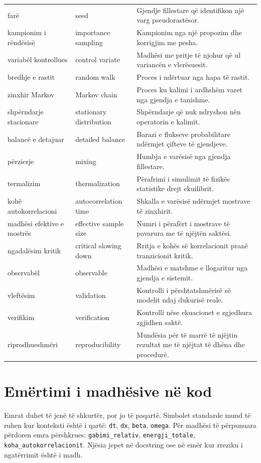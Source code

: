 \documentclass[11pt,oneside,openany]{book}
\begin{document}
\begin{longtable}{p{}p{}p{}}
farë & seed & Gjendje fillestare që identifikon një varg pseudorastësor.\\
kampionim i rëndësisë & importance sampling & Kampionim nga një propozim dhe korrigjim me pesha.\\
variabël kontrollues & control variate & Madhësi me pritje të njohur që ul variancën e vlerësuesit.\\
bredhje e rastit & random walk & Proces i ndërtuar nga hapa të rastit.\\
zinxhir Markov & Markov chain & Proces ku kalimi i ardhshëm varet nga gjendja e tanishme.\\
shpërndarje stacionare & stationary distribution & Shpërndarje që nuk ndryshon nën operatorin e kalimit.\\
balancë e detajuar & detailed balance & Barazi e flukseve probabilitare ndërmjet çifteve të gjendjeve.\\
përzierje & mixing & Humbja e varësisë nga gjendja fillestare.\\
termalizim & thermalization & Përafrimi i simulimit të fizikës statistike drejt ekuilibrit.\\
kohë autokorrelacioni & autocorrelation time & Shkalla e varësisë ndërmjet mostrave të zinxhirit.\\
madhësi efektive e mostrës & effective sample size & Numri i përafërt i mostrave të pavarura me të njëjtën saktësi.\\
ngadalësim kritik & critical slowing down & Rritja e kohës së korrelacionit pranë tranzicionit kritik.\\
observabël & observable & Madhësi e matshme e llogaritur nga gjendja e sistemit.\\
vleftësim & validation & Kontrolli i përshtatshmërisë së modelit ndaj dukurisë reale.\\
verifikim & verification & Kontrolli nëse ekuacionet e zgjedhura zgjidhen saktë.\\
riprodhueshmëri & reproducibility & Mundësia për të marrë të njëjtin rezultat me të njëjtat të dhëna dhe procedurë.\\
\bottomrule
\end{longtable}
\normalsize

\section{Emërtimi i madhësive në kod}
Emrat duhet të jenë të shkurtër, por jo të paqartë. Simbolet standarde mund të ruhen kur konteksti është i qartë: \texttt{dt}, \texttt{dx}, \texttt{beta}, \texttt{omega}. Për madhësi të përpunuara përdoren emra përshkrues: \texttt{gabimi\_relativ}, \texttt{energji\_totale}, \texttt{koha\_autokorrelacionit}. Njësia jepet në docstring ose në emër kur rreziku i ngatërrimit është i madh.
\end{document}
